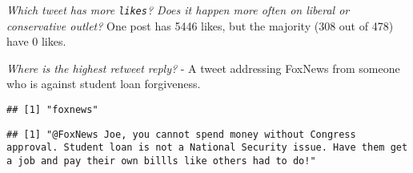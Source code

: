 \documentclass[
]{article}
\newenvironment{Shaded}{\begin{snugshade}}{\end{snugshade}}
\newcommand{\FunctionTok}[1]{\textcolor[rgb]{0.00,0.00,0.00}{#1}}
\newcommand{\NormalTok}[1]{#1}
\newcommand{\OtherTok}[1]{\textcolor[rgb]{0.56,0.35,0.01}{#1}}
\newcommand{\SpecialCharTok}[1]{\textcolor[rgb]{0.00,0.00,0.00}{#1}}
\newcommand{\StringTok}[1]{\textcolor[rgb]{0.31,0.60,0.02}{#1}}
\begin{document}
\emph{Which tweet has more \texttt{likes}? Does it happen more often on
liberal or conservative outlet?} One post has 5446 likes, but the
majority (308 out of 478) have 0 likes.

\begin{Shaded}
\end{Shaded}

\emph{Where is the highest retweet reply?} - A tweet addressing FoxNews
from someone who is against student loan forgiveness.

\begin{Shaded}
\end{Shaded}

\begin{verbatim}
## [1] "foxnews"
\end{verbatim}

\begin{Shaded}
\end{Shaded}

\begin{verbatim}
## [1] "@FoxNews Joe, you cannot spend money without Congress approval. Student loan is not a National Security issue. Have them get a job and pay their own billls like others had to do!"
\end{verbatim}

\begin{Shaded}
\end{Shaded}
\end{document}
